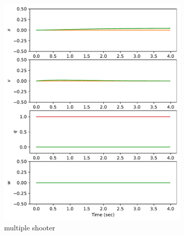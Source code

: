 \documentclass[]{article}
\begin{document}
\begin{figure}[H]
	\centering
	\begin{subfigure}[b]{0.3\textwidth}
		\centering
		\includegraphics[width=\textwidth]{figures/statehover3.pdf}
		\caption{multiple shooter}
	\end{subfigure}
	\begin{subfigure}[b]{0.3\textwidth}
		\centering

\end{subfigure}
\end{figure}
\end{document}
